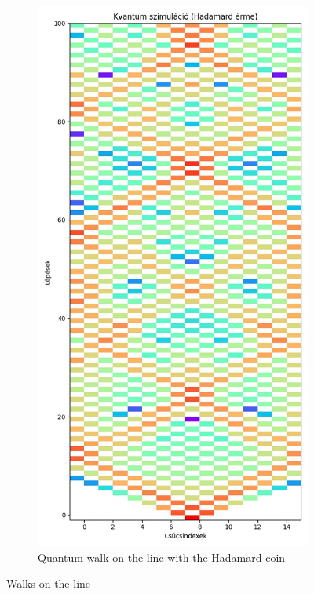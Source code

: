 \begin{figure}[H]
\begin{subfigure}{.45\linewidth}
  \end{subfigure}
  \begin{subfigure}{.45\linewidth}
    \centering
    \includegraphics[width=\linewidth]{./figures/results/path/hadamard.jpg}
    \caption{Quantum walk on the line with the Hadamard coin}
  \end{subfigure}
  \caption{Walks on the line}
  \label{fig:all}
\end{figure}


